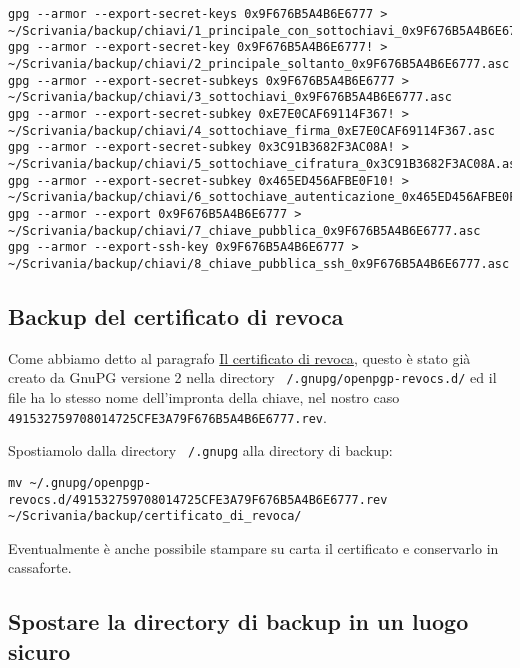 \documentclass[a4paper,10pt]{article}
\begin{document}
\begin{lstlisting}
gpg --armor --export-secret-keys 0x9F676B5A4B6E6777 > ~/Scrivania/backup/chiavi/1_principale_con_sottochiavi_0x9F676B5A4B6E6777.asc
gpg --armor --export-secret-key 0x9F676B5A4B6E6777! > ~/Scrivania/backup/chiavi/2_principale_soltanto_0x9F676B5A4B6E6777.asc
gpg --armor --export-secret-subkeys 0x9F676B5A4B6E6777 > ~/Scrivania/backup/chiavi/3_sottochiavi_0x9F676B5A4B6E6777.asc
gpg --armor --export-secret-subkey 0xE7E0CAF69114F367! > ~/Scrivania/backup/chiavi/4_sottochiave_firma_0xE7E0CAF69114F367.asc
gpg --armor --export-secret-subkey 0x3C91B3682F3AC08A! > ~/Scrivania/backup/chiavi/5_sottochiave_cifratura_0x3C91B3682F3AC08A.asc
gpg --armor --export-secret-subkey 0x465ED456AFBE0F10! > ~/Scrivania/backup/chiavi/6_sottochiave_autenticazione_0x465ED456AFBE0F10.asc
gpg --armor --export 0x9F676B5A4B6E6777 > ~/Scrivania/backup/chiavi/7_chiave_pubblica_0x9F676B5A4B6E6777.asc
gpg --armor --export-ssh-key 0x9F676B5A4B6E6777 > ~/Scrivania/backup/chiavi/8_chiave_pubblica_ssh_0x9F676B5A4B6E6777.asc
\end{lstlisting}

\subsection{Backup del certificato di revoca}
\label{sec:backup-certificato-revoca}

Come abbiamo detto al paragrafo \hyperref[sec:certificato-revoca]{Il certificato di revoca}, questo è stato già creato da GnuPG versione 2 nella directory \texttt{~/.gnupg/openpgp-revocs.d/} ed il file ha lo stesso nome dell'impronta della chiave, nel nostro caso \newline \texttt{491532759708014725CFE3A79F676B5A4B6E6777.rev}.

Spostiamolo dalla directory \texttt{~/.gnupg} alla directory di backup:

\begin{lstlisting}
mv ~/.gnupg/openpgp-revocs.d/491532759708014725CFE3A79F676B5A4B6E6777.rev ~/Scrivania/backup/certificato_di_revoca/
\end{lstlisting}

Eventualmente è anche possibile stampare su carta il certificato e conservarlo in cassaforte.

\subsection{Spostare la directory di backup in un luogo sicuro}
\end{document}
